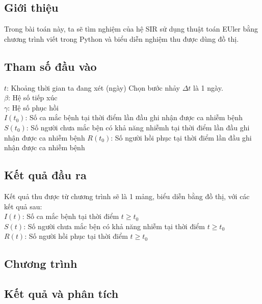 \documentclass[a4paper]{article}
\begin{document}
\subsection{Giới thiệu}
Trong bài toán này, ta sẽ tìm nghiệm của hệ SIR sử dụng thuật toán EUler bằng chương trình viết trong Python và biểu diễn nghiệm thu được dùng đồ thị.
\subsection{Tham số đầu vào}
$t$: Khoảng thời gian ta đang xét (ngày) Chọn bước nhảy $\Delta t$ là 1 ngày.\\
$\beta$: Hệ số tiếp xúc\\
$\gamma$: Hệ số phục hồi\\
$I(t_0)$: Số ca mắc bệnh tại thời điểm lần đầu ghi nhận được ca nhiễm bệnh
$S(t_0)$: Số người chưa mắc bện có khả năng nhiễmh tại thời điểm lần đầu ghi nhận được ca nhiễm bệnh
$R(t_0)$: Số người hồi phục tại thời điểm lần đầu ghi nhận được ca nhiễm bệnh
\subsection{Kết quả đầu ra}
Kết quả thu được từ chương trình sẽ là 1 mảng, biểu diễn bằng đồ thị, với các kết quả sau:\\
$I(t)$: Số ca mắc bệnh tại thời điểm $t \geq t_0$\\
$S(t)$: Số người chưa mắc bện có khả năng nhiễm tại thời điểm $t \geq t_0$ \\
$R(t)$: Số người hồi phục tại thời điểm $t \geq t_0$\\
\subsection{Chương trình}

\subsection{Kết quả và phân tích}
\end{document}
